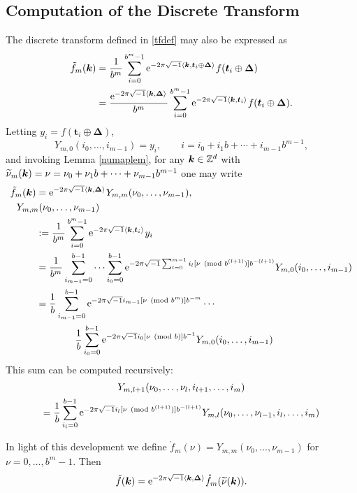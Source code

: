 \documentclass[graybox,footinfo]{svmult}
\newcommand{\Z}{\mathbb{Z}} %
\newcommand{\bst}{\boldsymbol{t}}    %
\newcommand{\bsDelta}{\boldsymbol{\Delta}}    %
\begin{document}
\subsection{Computation of the Discrete Transform}
The discrete transform defined in \eqref{tfdef} may also be expressed as
\begin{align}
\nonumber
\tf_m(\bsk)
&= \frac{1}{b^m} \sum_{i=0}^{b^m-1} \me^{-2 \pi \sqrt{-1} \ip{\bsk}{\bst_i\oplus \bsDelta}} f(\bst_i\oplus \bsDelta) \\
\nonumber
&= \frac{\me^{-2 \pi \sqrt{-1} \ip{\bsk}{\bsDelta}}}{b^m} \sum_{i=0}^{b^m-1} \me^{-2 \pi \sqrt{-1} \ip{\bsk}{\bst_i}} f(\bst_i\oplus \bsDelta).
\end{align}
Letting $y_i=f(\bst_i\oplus \bsDelta)$,
\[
Y_{m,0}(i_0,\ldots, i_{m-1}) = y_i, \qquad i=i_0 + i_1 b + \cdots + i_{m-1} b^{m-1},
\]
and invoking Lemma \ref{numaplem}, for any $\bsk \in \Z^d$ with $\widetilde{\nu}_m(\boldsymbol{k})=\nu = \nu_0 + \nu_1 b  + \cdots + \nu_{m-1} b^{m-1}$ one may write
\begin{align}
\nonumber
\tf_m(\bsk) &= \me^{-2 \pi \sqrt{-1} \ip{\bsk}{\bsDelta}}  Y_{m,m}(\nu_0, \ldots, \nu_{m-1}) , \\
\nonumber
\MoveEqLeft{Y_{m,m}(\nu_0, \ldots, \nu_{m-1})}\\
\nonumber
& : = \frac{1}{b^m} \sum_{i=0}^{b^m-1} \me^{-2 \pi \sqrt{-1} \ip{\bsk}{\bst_i}} y_i \\
\nonumber
& = \frac{1}{b^m} \sum_{i_{m-1}=0}^{b-1} \cdots \sum_{i_0=0}^{b-1} \me^{-2 \pi \sqrt{-1}\sum_{l=0}^{m-1} i_l [\nu \pmod  {b^{(l+1)}}]  b^{-(l+1)}} Y_{m,0}(i_0,\ldots, i_{m-1}) \\
\nonumber
& = \frac{1}{b} \sum_{i_{m-1}=0}^{b-1}\me^{-2 \pi \sqrt{-1}  i_{m-1}[\nu \pmod  {b^{m}}]  b^{-m}}  \cdots \\
&\qquad \qquad \frac{1}{b} \sum_{i_0=0}^{b-1} \me^{-2 \pi \sqrt{-1} i_0 [\nu \pmod  {b}]  b^{-1}} Y_{m,0}(i_0,\ldots, i_{m-1})
\nonumber
\end{align}
This sum can be computed recursively:
\begin{multline*}
Y_{m,l+1}(\nu_0, \ldots, \nu_{l},i_{l+1}, \ldots, i_m) \\
= \frac{1}{b} \sum_{i_l=0}^{b-1} \text{e}^{-2 \pi \sqrt{-1}  i_{l}[\nu \pmod  {b^{(l+1)}}]  b^{-(l+1)}} Y_{m,l}(\nu_0, \ldots, \nu_{l-1},i_{l}, \ldots, i_m)
\end{multline*}

In light of this development we define $\mathring{f}_m(\nu)=Y_{m,m}(\nu_0, \ldots, \nu_{m-1})$ for $\nu=0, \ldots, b^{m}-1$. Then
\[
\tf(\bsk) = \me^{-2 \pi \sqrt{-1} \ip{\bsk}{\bsDelta}} \mathring{f}_m(\tnu(\bsk)).
\]
\end{document}
